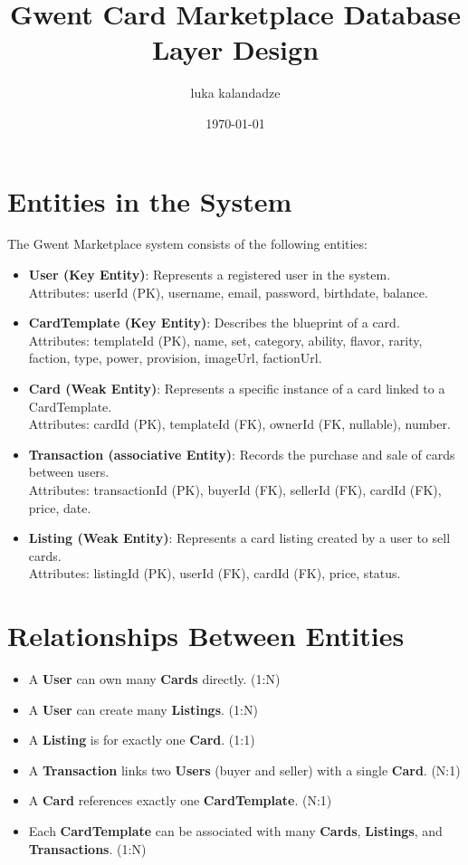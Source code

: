 \documentclass[13pt]{article}
\title{Gwent Card Marketplace Database Layer Design}
\author{luka kalandadze}
\date{\today}
\begin{document}
\maketitle

\section{Entities in the System}
The Gwent Marketplace system consists of the following entities:

\begin{itemize}
    \item \textbf{User (Key Entity)}: Represents a registered user in the system. \\
    Attributes: userId (PK), username, email, password, birthdate, balance.

    \item \textbf{CardTemplate (Key Entity)}: Describes the blueprint of a card. \\
    Attributes: templateId (PK), name, set, category, ability, flavor, rarity, faction, type, power, provision, imageUrl, factionUrl.

    \item \textbf{Card (Weak Entity)}: Represents a specific instance of a card linked to a CardTemplate. \\
    Attributes: cardId (PK), templateId (FK), ownerId (FK, nullable), number.

    \item \textbf{Transaction (associative Entity)}: Records the purchase and sale of cards between users. \\
    Attributes: transactionId (PK), buyerId (FK), sellerId (FK), cardId (FK), price, date.

    \item \textbf{Listing (Weak Entity)}: Represents a card listing created by a user to sell cards. \\
    Attributes: listingId (PK), userId (FK), cardId (FK), price, status.
\end{itemize}

\section{Relationships Between Entities}
\begin{itemize}
    \item A \textbf{User} can own many \textbf{Cards} directly. (1:N)
    \item A \textbf{User} can create many \textbf{Listings}. (1:N)
    \item A \textbf{Listing} is for exactly one \textbf{Card}. (1:1)
    \item A \textbf{Transaction} links two \textbf{Users} (buyer and seller) with a single \textbf{Card}. (N:1)
    \item A \textbf{Card} references exactly one \textbf{CardTemplate}. (N:1)
    \item Each \textbf{CardTemplate} can be associated with many \textbf{Cards}, \textbf{Listings}, and \textbf{Transactions}. (1:N)
\end{itemize}
\end{document}
